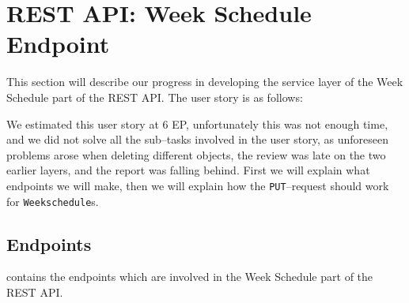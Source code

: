 \section{REST API: Week Schedule Endpoint}\label{sec:weekscheduleendpoint}
This section will describe our progress in developing the service layer of the Week Schedule part of the REST API.
The user story is as follows:
\begin{center}
\end{center}

We estimated this user story at 6 EP, unfortunately this was not enough time, and we did not solve all the sub--tasks involved in the user story, as unforeseen problems arose when deleting different objects, the review was late on the two earlier layers, and the report was falling behind.
First we will explain what endpoints we will make, then we will explain how the \texttt{PUT}--request should work for \texttt{Weekschedule}s.
\subsection{Endpoints}
 contains the endpoints which are involved in the Week Schedule part of the REST API.

